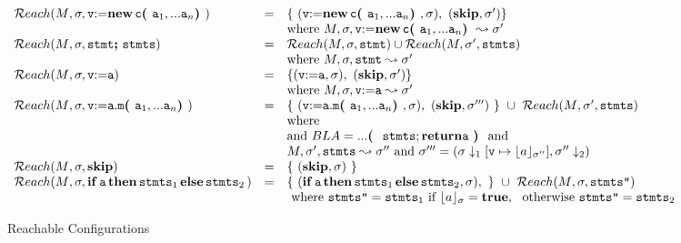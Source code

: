 \begin{figure*} 
$
\begin{array}{lcl}
  \\
 \Reach(\M{}, \sigma, \prg{v}\kw{:=} \kw{new}\, \clss{}\lp \prg{a}_1,...\prg{a}_n \rp) & = &  \{ \ ( \prg{v}\kw{:=}\kw{new}\, \clss{}\lp \prg{a}_1,...\prg{a}_n \rp,\sigma), \ ( \kw{skip}, \sigma' ) \}
 \\
 & &  \mbox{where }  \M,\sigma, \prg{v}\kw{:=} \kw{new}\, \clss{}\lp \prg{a}_1,...\prg{a}_n \rp \leadsto \sigma'
 \\
\Reach(\M{}, \sigma,\prg{stmt}\semi\prg{stmts}) & = &  
\Reach(\M,\sigma,\prg{stmt}) \cup \Reach(\M, \sigma',\prg{stmts})  
\\ & & \mbox{where }  \M,\sigma, \prg{stmt} \leadsto \sigma'
\\
\Reach(\M{}, \sigma,\prg{v}\kw{:=}\prg{a}) & = & 
 \{ ( \prg{v}\kw{:=}\prg{a}, \sigma), \ ( \kw{skip}, \sigma' ) \}
 \\
 & &  \mbox{where }  \M,\sigma, \prg{v}\kw{:=} \prg{a} \leadsto \sigma'
\\
\Reach(\M{}, \sigma,\prg{v} \kw{:=} \prg{a}\kw{.}\prg{m}\lp \prg{a}_1,...\prg{a}_n \rp) & = &
\{ \ (\prg{v} \kw{:=}\prg{a}\kw{.}\prg{m}\lp \prg{a}_1,...\prg{a}_n \rp, \sigma ) , \ ({\kw {skip}}, \sigma''' ) \  \} \ \cup 
\ \Reach(\M{}, \sigma',\prg{stmts}) \\ 
& &  \mbox{where}
 \\ 
& &  \mbox{and} \  
BLA

      = ... \lp\ \prg{stmts}\kw{;} \, \kw{return} \prg{a}\ \rp   
     \  \mbox{and}  \\
     & & 
       \M,\sigma', \prg{stmts}  \leadsto \sigma''   \  \mbox{and} \ \sigma'''= (\sigma\downarrow_1[\prg{v} \mapsto \interp{a}{\sigma''}],  \sigma''\downarrow_2)
\\
\Reach(\M{}, \sigma,{\kw {skip}}) & = &
\{ \ ({\kw {skip}}, \sigma ) \  \}   \\ 
\Reach(\M{}, \sigma,{\kw {if}}\, \prg{a}\, {\kw {then}}\, \prg{stmts}_1\, {\kw {else}}\, \prg{stmts}_2\, ) & = &
\{ \ ( {\kw {if}}\, \prg{a}\, {\kw {then}}\, \prg{stmts}_1\, {\kw {else}}\, \prg{stmts}_2, \sigma ) , \  \}  \  \cup \
\Reach(\M{}, \sigma,\prg{stmts''})\\
& & \mbox{ where } \prg{stmts''}=\prg{stmts}_1 \mbox{ if } \interp{a}{\sigma}={\kw {true}},\ \mbox{ otherwise } 
\prg{stmts''}=\prg{stmts}_2
\end{array}
$
\caption{Reachable Configurations\label{fig:reach}}
\end{figure*} 



 
   
